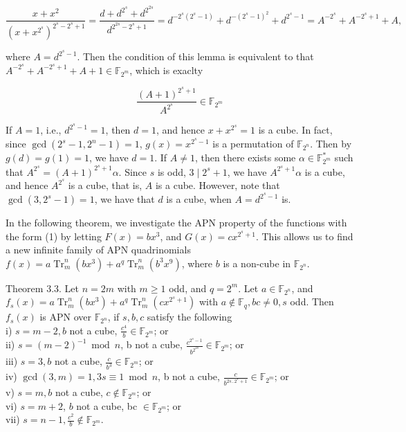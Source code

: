 \documentclass[10pt]{article}
\begin{document}
$$
\frac{x+x^{2}}{\left(x+x^{2^{s}}\right)^{2^{s}-2^{s}+1}}=\frac{d+d^{2^{s}}+d^{2^{2 s}}}{d^{2^{2 s}-2^{s}+1}}=d^{-2^{s}\left(2^{s}-1\right)}+d^{-\left(2^{s}-1\right)^{2}}+d^{2^{s}-1}=A^{-2^{s}}+A^{-2^{s}+1}+A,
$$

where $A=d^{2^{s}-1}$. Then the condition of this lemma is equivalent to that $A^{-2^{s}}+A^{-2^{s}+1}+A+1 \in \mathbb{F}_{2^{m}}$, which is exaclty

$$
\frac{(A+1)^{2^{s}+1}}{A^{2^{s}}} \in \mathbb{F}_{2^{m}}
$$

If $A=1$, i.e., $d^{2^{s}-1}=1$, then $d=1$, and hence $x+x^{2^{s}}=1$ is a cube. In fact, since $\operatorname{gcd}\left(2^{s}-1,2^{n}-1\right)=1$, $g(x)=x^{2^{s}-1}$ is a permutation of $\mathbb{F}_{2^{n}}$. Then by $g(d)=g(1)=1$, we have $d=1$. If $A \neq 1$, then there exists some $\alpha \in \mathbb{F}_{2^{m}}^{*}$ such that $A^{2^{s}}=(A+1)^{2^{s}+1} \alpha$. Since $s$ is odd, $3 \mid 2^{s}+1$, we have $A^{2^{s}+1} \alpha$ is a cube, and hence $A^{2^{s}}$ is a cube, that is, $A$ is a cube. However, note that $\operatorname{gcd}\left(3,2^{s}-1\right)=1$, we have that $d$ is a cube, when $A=d^{2^{s}-1}$ is.

In the following theorem, we investigate the APN property of the functions with the form (1) by letting $F(x)=b x^{3}$, and $G(x)=c x^{2^{s}+1}$. This allows us to find a new infinite family of APN quadrinomials $f(x)= a \operatorname{Tr}_{m}^{n}\left(b x^{3}\right)+a^{q} \operatorname{Tr}_{m}^{n}\left(b^{3} x^{9}\right)$, where $b$ is a non-cube in $\mathbb{F}_{2^{n}}$.

Theorem 3.3. Let $n=2 m$ with $m \geq 1$ odd, and $q=2^{m}$. Let $a \in \mathbb{F}_{2^{n}}$, and $f_{s}(x)=a \operatorname{Tr}_{m}^{n}\left(b x^{3}\right)+a^{q} \operatorname{Tr}_{m}^{n}\left(c x^{2^{s}+1}\right)$ with $a \notin \mathbb{F}_{q}, b c \neq 0, s$ odd. Then $f_{s}(x)$ is APN over $\mathbb{F}_{2^{n}}$, if $s, b, c$ satisfy the following\\
i) $s=m-2, b$ not a cube, $\frac{c^{4}}{b} \in \mathbb{F}_{2^{m}}$; or\\
ii) $s=(m-2)^{-1} \bmod n$, b not a cube, $\frac{c^{2^{s}-1}}{b^{2^{2 s}}} \in \mathbb{F}_{2^{m}}$; or\\
iii) $s=3, b$ not a cube, $\frac{c}{b^{3}} \in \mathbb{F}_{2^{m}}$; or\\
iv) $\operatorname{gcd}(3, m)=1,3 s \equiv 1 \bmod n$, b not a cube, $\frac{c}{b^{2 s_{-} 2^{s}+1}} \in \mathbb{F}_{2^{m}}$; or\\
v) $s=m, b$ not a cube, $c \notin \mathbb{F}_{2^{m}}$; or\\
vi) $s=m+2$, $b$ not a cube, bc $\in \mathbb{F}_{2^{m}}$; or\\
vii) $s=n-1, \frac{c^{2}}{b} \notin \mathbb{F}_{2^{m}}$.
\end{document}
